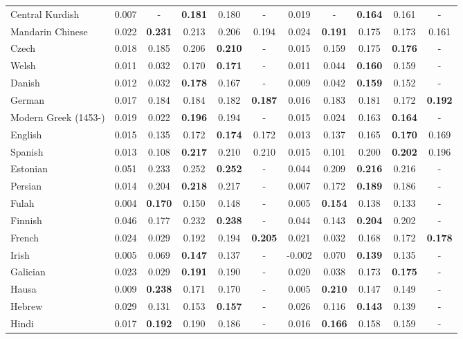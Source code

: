 \begin{longtable}{lcccccccccc}
Central Kurdish & 0.007 & - & \textbf{0.181} & 0.180 & - & 0.019 & - & \textbf{0.164} & 0.161 & - \\
Mandarin Chinese & 0.022 & \textbf{0.231} & 0.213 & 0.206 & 0.194 & 0.024 & \textbf{0.191} & 0.175 & 0.173 & 0.161 \\
Czech & 0.018 & 0.185 & 0.206 & \textbf{0.210} & - & 0.015 & 0.159 & 0.175 & \textbf{0.176} & - \\
Welsh & 0.011 & 0.032 & 0.170 & \textbf{0.171} & - & 0.011 & 0.044 & \textbf{0.160} & 0.159 & - \\
Danish & 0.012 & 0.032 & \textbf{0.178} & 0.167 & - & 0.009 & 0.042 & \textbf{0.159} & 0.152 & - \\
German & 0.017 & 0.184 & 0.184 & 0.182 & \textbf{0.187} & 0.016 & 0.183 & 0.181 & 0.172 & \textbf{0.192} \\
Modern Greek (1453-) & 0.019 & 0.022 & \textbf{0.196} & 0.194 & - & 0.015 & 0.024 & 0.163 & \textbf{0.164} & - \\
English & 0.015 & 0.135 & 0.172 & \textbf{0.174} & 0.172 & 0.013 & 0.137 & 0.165 & \textbf{0.170} & 0.169 \\
Spanish & 0.013 & 0.108 & \textbf{0.217} & 0.210 & 0.210 & 0.015 & 0.101 & 0.200 & \textbf{0.202} & 0.196 \\
Estonian & 0.051 & 0.233 & 0.252 & \textbf{0.252} & - & 0.044 & 0.209 & \textbf{0.216} & 0.216 & - \\
Persian & 0.014 & 0.204 & \textbf{0.218} & 0.217 & - & 0.007 & 0.172 & \textbf{0.189} & 0.186 & - \\
Fulah & 0.004 & \textbf{0.170} & 0.150 & 0.148 & - & 0.005 & \textbf{0.154} & 0.138 & 0.133 & - \\
Finnish & 0.046 & 0.177 & 0.232 & \textbf{0.238} & - & 0.044 & 0.143 & \textbf{0.204} & 0.202 & - \\
French & 0.024 & 0.029 & 0.192 & 0.194 & \textbf{0.205} & 0.021 & 0.032 & 0.168 & 0.172 & \textbf{0.178} \\
Irish & 0.005 & 0.069 & \textbf{0.147} & 0.137 & - & -0.002 & 0.070 & \textbf{0.139} & 0.135 & - \\
Galician & 0.023 & 0.029 & \textbf{0.191} & 0.190 & - & 0.020 & 0.038 & 0.173 & \textbf{0.175} & - \\
Hausa & 0.009 & \textbf{0.238} & 0.171 & 0.170 & - & 0.005 & \textbf{0.210} & 0.147 & 0.149 & - \\
Hebrew & 0.029 & 0.131 & 0.153 & \textbf{0.157} & - & 0.026 & 0.116 & \textbf{0.143} & 0.139 & - \\
Hindi & 0.017 & \textbf{0.192} & 0.190 & 0.186 & - & 0.016 & \textbf{0.166} & 0.158 & 0.159 & - \\

\end{longtable}

